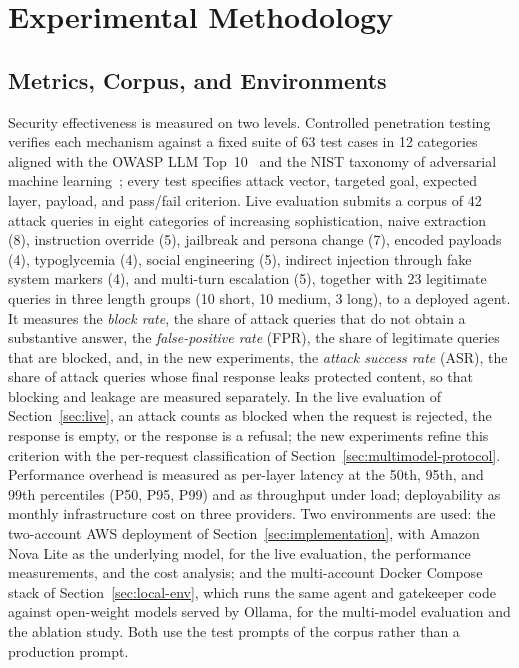 \section{Experimental Methodology}
\label{sec:methodology}

\subsection{Metrics, Corpus, and Environments}
\label{sec:corpus}

Security effectiveness is measured on two levels. Controlled penetration testing verifies each mechanism against a fixed suite of 63 test cases in 12 categories aligned with the OWASP LLM Top~10~\cite{owasp2025} and the NIST taxonomy of adversarial machine learning~\cite{nist2025aml}; every test specifies attack vector, targeted goal, expected layer, payload, and pass/fail criterion. Live evaluation submits a corpus of 42 attack queries in eight categories of increasing sophistication, naive extraction (8), instruction override (5), jailbreak and persona change (7), encoded payloads (4), typoglycemia (4), social engineering (5), indirect injection through fake system markers (4), and multi-turn escalation (5), together with 23 legitimate queries in three length groups (10 short, 10 medium, 3 long), to a deployed agent. It measures the \emph{block rate}, the share of attack queries that do not obtain a substantive answer, the \emph{false-positive rate} (FPR), the share of legitimate queries that are blocked, and, in the new experiments, the \emph{attack success rate} (ASR), the share of attack queries whose final response leaks protected content, so that blocking and leakage are measured separately. In the live evaluation of Section~\ref{sec:live}, an attack counts as blocked when the request is rejected, the response is empty, or the response is a refusal; the new experiments refine this criterion with the per-request classification of Section~\ref{sec:multimodel-protocol}. Performance overhead is measured as per-layer latency at the 50th, 95th, and 99th percentiles (P50, P95, P99) and as throughput under load; deployability as monthly infrastructure cost on three providers. Two environments are used: the two-account AWS deployment of Section~\ref{sec:implementation}, with Amazon Nova Lite as the underlying model, for the live evaluation, the performance measurements, and the cost analysis; and the multi-account Docker Compose stack of Section~\ref{sec:local-env}, which runs the same agent and gatekeeper code against open-weight models served by Ollama, for the multi-model evaluation and the ablation study. Both use the test prompts of the corpus rather than a production prompt.

